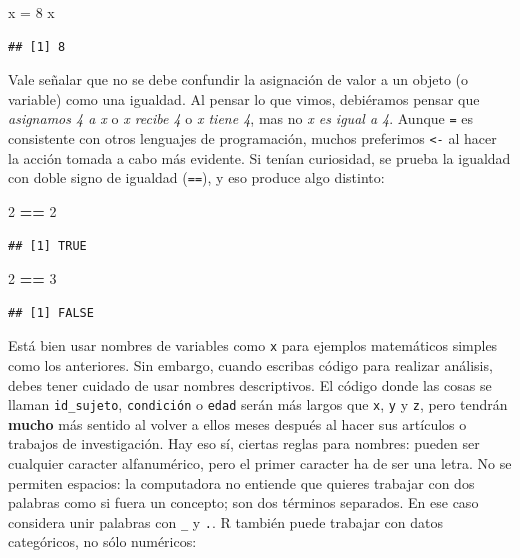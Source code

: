 \documentclass[
]{article}
\newenvironment{Shaded}{\begin{snugshade}}{\end{snugshade}}
\newcommand{\DecValTok}[1]{\textcolor[rgb]{0.00,0.00,0.81}{#1}}
\newcommand{\NormalTok}[1]{#1}
\newcommand{\OtherTok}[1]{\textcolor[rgb]{0.56,0.35,0.01}{#1}}
\newcommand{\SpecialCharTok}[1]{\textcolor[rgb]{0.81,0.36,0.00}{\textbf{#1}}}
\begin{document}
\begin{Shaded}
\begin{Highlighting}[]
\NormalTok{x }\OtherTok{=} \DecValTok{8}
\NormalTok{x}
\end{Highlighting}
\end{Shaded}

\begin{verbatim}
## [1] 8
\end{verbatim}

Vale señalar que no se debe confundir la asignación de valor a un objeto
(o variable) como una igualdad. Al pensar lo que vimos, debiéramos
pensar que \emph{asignamos 4 a x} o \emph{x recibe 4} o \emph{x tiene
4}, mas no \emph{x es igual a 4}. Aunque \texttt{=} es consistente con
otros lenguajes de programación, muchos preferimos \texttt{\textless{}-}
al hacer la acción tomada a cabo más evidente. Si tenían curiosidad, se
prueba la igualdad con doble signo de igualdad (\texttt{==}), y eso
produce algo distinto:

\begin{Shaded}
\begin{Highlighting}[]
\DecValTok{2} \SpecialCharTok{==} \DecValTok{2}
\end{Highlighting}
\end{Shaded}

\begin{verbatim}
## [1] TRUE
\end{verbatim}

\begin{Shaded}
\begin{Highlighting}[]
\DecValTok{2} \SpecialCharTok{==} \DecValTok{3}
\end{Highlighting}
\end{Shaded}

\begin{verbatim}
## [1] FALSE
\end{verbatim}

Está bien usar nombres de variables como \texttt{x} para ejemplos
matemáticos simples como los anteriores. Sin embargo, cuando escribas
código para realizar análisis, debes tener cuidado de usar nombres
descriptivos. El código donde las cosas se llaman \texttt{id\_sujeto},
\texttt{condición} o \texttt{edad} serán más largos que \texttt{x},
\texttt{y} y \texttt{z}, pero tendrán \textbf{mucho} más sentido al
volver a ellos meses después al hacer sus artículos o trabajos de
investigación. Hay eso sí, ciertas reglas para nombres: pueden ser
cualquier caracter alfanumérico, pero el primer caracter ha de ser una
letra. No se permiten espacios: la computadora no entiende que quieres
trabajar con dos palabras como si fuera un concepto; son dos términos
separados. En ese caso considera unir palabras con \texttt{\_} y
\texttt{.}. R también puede trabajar con datos categóricos, no sólo
numéricos:
\end{document}
